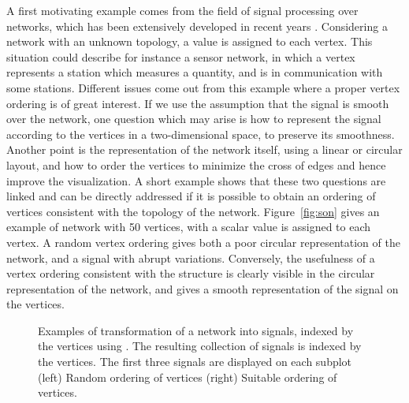 \documentclass{scrartcl}
\theoremstyle{plain}
\begin{document}
A first motivating example comes from the field of signal processing over 
networks, which has been extensively developed in recent years 
\cite{Shuman2013}. Considering a network with an unknown topology, a value is 
assigned to each vertex. This situation could describe for instance a sensor 
network, in which a vertex represents a station which measures a quantity, and 
is in communication with some stations. Different issues come out from this 
example where a proper vertex ordering is of great interest. If we use the 
assumption that the signal is smooth over the network, one question which may 
arise is how to represent the signal according to the vertices in a 
two-dimensional space, to preserve its smoothness. Another point is the 
representation of the network itself, using a linear or circular layout, and how 
to order the vertices to minimize the cross of edges and hence improve the 
visualization. A short example shows that these two questions are linked and can 
be directly addressed if it is possible to obtain an ordering of vertices 
consistent with the topology of the network. Figure~\ref{fig:son} gives an 
example of network with 50 vertices, with a scalar value is assigned to each 
vertex. A random vertex ordering gives both a poor circular representation of 
the network, and a signal with abrupt variations. Conversely, the usefulness of 
a vertex ordering consistent with the structure is clearly visible in the 
circular representation of the network, and gives a smooth representation of the 
signal on the vertices.

\begin{figure}[!ht]
  \centering
  
     \hspace{1cm}

\caption{\label{fig:nas}Examples of transformation of a network into signals, 
indexed by the vertices using \cite{Shimada2012}. The resulting collection of 
signals is indexed by the vertices. The first three signals are displayed on 
each subplot (left) Random ordering of vertices (right) Suitable ordering of 
vertices.}

\end{figure}
\end{document}
